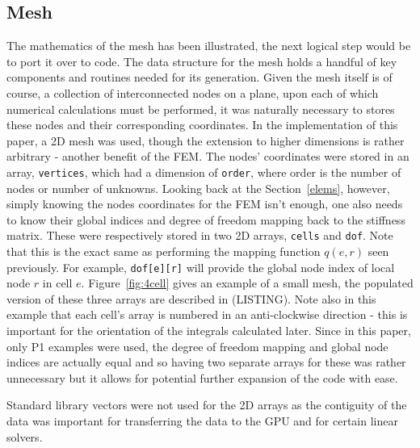 \subsection{Mesh}\label{mesh}

The mathematics of the mesh has been illustrated, the next logical step would be to port it over to code. The data structure for the mesh holds a handful of key components and routines needed for its generation. Given the mesh itself is of course, a collection of interconnected nodes on a plane, upon each of which numerical calculations must be performed, it was naturally necessary to stores these nodes and their corresponding coordinates. In the implementation of this paper, a 2D mesh was used, though the extension to higher dimensions is rather arbitrary - another benefit of the FEM. The nodes' coordinates were stored in an array, \texttt{vertices}, which had a dimension of \texttt{order}, where order is the number of nodes or number of unknowns. Looking back at the Section~\ref{elems}, however, simply knowing the nodes coordinates for the FEM isn't enough, one also needs to know their global indices and degree of freedom mapping back to the stiffness matrix. These were respectively stored in two 2D arrays, \texttt{cells} and \texttt{dof}. Note that this is the exact same as performing the mapping function $q(e,r)$ seen previously. For example, \texttt{dof[e][r]} will provide the global node index of local node $r$ in cell $e$. Figure~\ref{fig:4cell} gives an example of a small mesh, the populated version of these three arrays are described in (LISTING). Note also in this example that each cell's array is numbered in an anti-clockwise direction - this is important for the orientation of the integrals calculated later. Since in this paper, only P1 examples were used, the degree of freedom mapping and global node indices are actually equal and so having two separate arrays for these was rather unnecessary but it allows for potential further expansion of the code with ease.

\begin{remark}
	Standard library vectors were not used for the 2D arrays as the contiguity of the data was important for transferring the data to the GPU and for certain linear solvers.
\end{remark}

